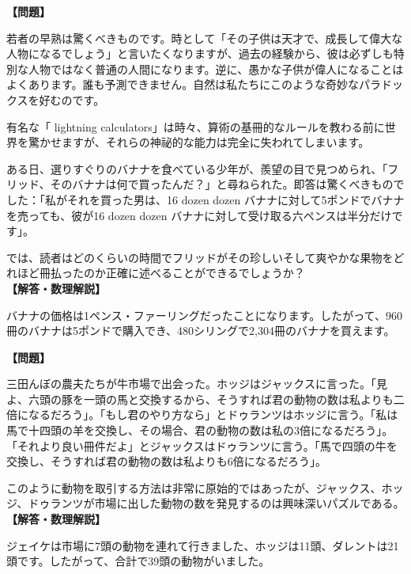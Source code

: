 \documentclass[10pt,a4paper,oneside,openany]{ltjsbook}
\begin{document}
\begin{tcolorbox}[colback=softblue,colframe=primaryblue,title=\textbf{第 2 問：青春の天才性 （原題: YOUTHFUL PRECOCITY.）},arc=2mm,boxrule=1pt,breakable]
\textbf{【問題】}\par\vspace{0.3em}
若者の早熟は驚くべきものです。時として「その子供は天才で、成長して偉大な人物になるでしょう」と言いたくなりますが、過去の経験から、彼は必ずしも特別な人物ではなく普通の人間になります。逆に、愚かな子供が偉人になることはよくあります。誰も予測できません。自然は私たちにこのような奇妙なパラドックスを好むのです。

有名な「 lightning calculators」は時々、算術の基冊的なルールを教わる前に世界を驚かせますが、それらの神祕的な能力は完全に失われてしまいます。

ある日、選りすぐりのバナナを食べている少年が、羨望の目で見つめられ、「フリッド、そのバナナは何で買ったんだ？」と尋ねられた。即答は驚くべきものでした：「私がそれを買った男は、16 dozen dozen バナナに対して5ポンドでバナナを売っても、彼が16 dozen dozen バナナに対して受け取る六ペンスは半分だけです」。

では、読者はどのくらいの時間でフリッドがその珍しいそして爽やかな果物をどれほど冊払ったのか正確に述べることができるでしょうか？
\tcblower
\textbf{【解答・数理解説】}\par\vspace{0.3em}
バナナの価格は1ペンス・ファーリングだったことになります。したがって、960冊のバナナは5ポンドで購入でき、480シリングで2,304冊のバナナを買えます。
\end{tcolorbox}

\begin{tcolorbox}[colback=softblue,colframe=primaryblue,title=\textbf{第 3 問：牛市場での出來事 （原題: AT A CATTLE MARKET.）},arc=2mm,boxrule=1pt,breakable]
\textbf{【問題】}\par\vspace{0.3em}
三田んぼの農夫たちが牛市場で出会った。ホッジはジャックスに言った。「見よ、六頭の豚を一頭の馬と交換するから、そうすれば君の動物の数は私よりも二倍になるだろう」。「もし君のやり方なら」とドゥランツはホッジに言う。「私は馬で十四頭の羊を交換し、その場合、君の動物の数は私の3倍になるだろう」。「それより良い冊件だよ」とジャックスはドゥランツに言う。「馬で四頭の牛を交換し、そうすれば君の動物の数は私よりも6倍になるだろう」。

このように動物を取引する方法は非常に原始的ではあったが、ジャックス、ホッジ、ドゥランツが市場に出した動物の数を発見するのは興味深いパズルである。
\tcblower
\textbf{【解答・数理解説】}\par\vspace{0.3em}
ジェイケは市場に7頭の動物を連れて行きました、ホッジは11頭、ダレントは21頭です。したがって、合計で39頭の動物がいました。
\end{tcolorbox}
\end{document}

